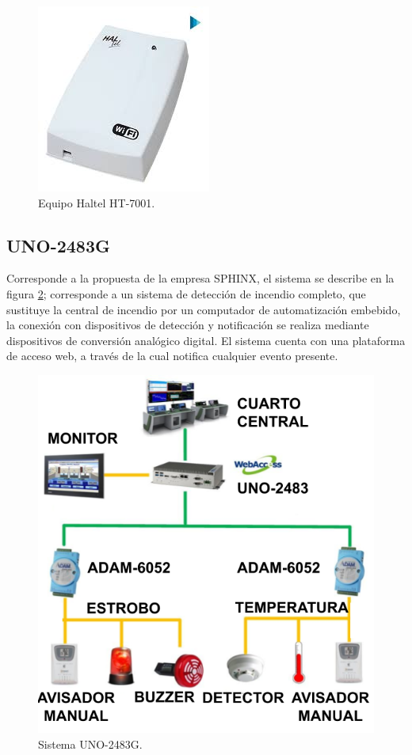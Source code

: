 \begin{figure}[h]
	\centering
	\includegraphics[scale=.4]{./Figures/Capitulo1/FIG_E1.jpeg}
	\caption{Equipo Haltel HT-7001.}
	\label{fig:figura_e1}
\end{figure}	
	
\subsection{UNO-2483G}

Corresponde a la propuesta de la empresa SPHINX\cite{uno}, el sistema se describe en la figura \ref{fig:figura_f1}; corresponde a un sistema de detección de incendio completo, que sustituye la central de incendio por un computador de automatización embebido, la conexión con dispositivos de detección y notificación se realiza mediante dispositivos de conversión analógico digital. El sistema cuenta con una plataforma de acceso web, a través de la cual notifica cualquier evento presente.  
	
	\begin{figure}[h]
	\centering
	\includegraphics[scale=.4]{./Figures/Capitulo1/FIG_F1.png}
	\caption{Sistema UNO-2483G.}
	\label{fig:figura_f1}
\end{figure}

